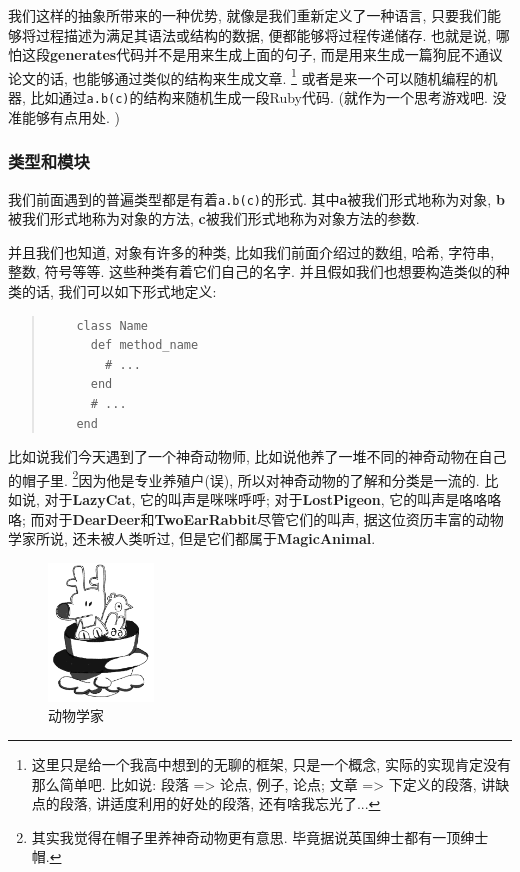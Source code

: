 \begin{example}
  我们这样的抽象所带来的一种优势, 就像是我们重新定义了一种语言, 只要我们能够将过程描述为满足其语法或结构的数据, 便都能够将过程传递储存. 也就是说, 哪怕这段\textbf{generates}代码并不是用来生成上面的句子, 而是用来生成一篇狗屁不通议论文的话, 也能够通过类似的结构来生成文章. \footnote{这里只是给一个我高中想到的无聊的框架, 只是一个概念, 实际的实现肯定没有那么简单吧. 比如说: 段落 => 论点, 例子, 论点; 文章 => 下定义的段落, 讲缺点的段落, 讲适度利用的好处的段落, 还有啥我忘光了...} 或者是来一个可以随机编程的机器, 比如通过\texttt{a.b(c)}的结构来随机生成一段Ruby代码. (就作为一个思考游戏吧. 没准能够有点用处. )
\end{example}

\subsubsection*{类型和模块}
我们前面遇到的普遍类型都是有着\texttt{a.b(c)}的形式. 其中\textbf{a}被我们形式地称为对象, \textbf{b}被我们形式地称为对象的方法, \textbf{c}被我们形式地称为对象方法的参数. 

并且我们也知道, 对象有许多的种类, 比如我们前面介绍过的数组, 哈希, 字符串, 整数, 符号等等. 这些种类有着它们自己的名字. 并且假如我们也想要构造类似的种类的话, 我们可以如下形式地定义: 

\begin{quotation}
  \begin{verbatim}
    class Name
      def method_name
        # ...
      end
      # ...
    end
  \end{verbatim}
\end{quotation}

比如说我们今天遇到了一个神奇动物师, 比如说他养了一堆不同的神奇动物在自己的帽子里. \footnote{其实我觉得在帽子里养神奇动物更有意思. 毕竟据说英国绅士都有一顶绅士帽. }因为他是专业养殖户(误), 所以对神奇动物的了解和分类是一流的. 比如说, 对于\textbf{LazyCat}, 它的叫声是咪咪呼呼; 对于\textbf{LostPigeon}, 它的叫声是咯咯咯咯; 而对于\textbf{DearDeer}和\textbf{TwoEarRabbit}尽管它们的叫声, 据这位资历丰富的动物学家所说, 还未被人类听过, 但是它们都属于\textbf{MagicAnimal}. 

\begin{figure}[h]
  \centering
  \includegraphics[width=0.25\textwidth]{image/chapter/1_language/class_of_animal.jpg}
  \caption{动物学家}
\end{figure}

